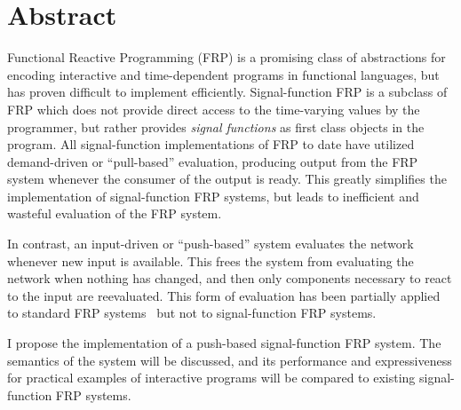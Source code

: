 \section*{Abstract}
Functional Reactive Programming (FRP) is a promising class of abstractions for encoding interactive and time-dependent programs in
functional languages, but has proven difficult to implement efficiently. Signal-function FRP is a subclass of FRP which does not provide
direct access to the time-varying  values by the programmer, but rather provides {\em signal functions} as first class objects in the
program. All signal-function implementations of FRP to date have utilized demand-driven or ``pull-based''  evaluation, producing output from
the FRP system whenever the consumer of the output is ready. This greatly simplifies the implementation of signal-function FRP systems, but
leads to inefficient and wasteful evaluation of the FRP system.

In contrast, an input-driven or ``push-based'' system evaluates the network whenever new input is available. This frees the system from
evaluating the network when nothing has changed, and then only components necessary to react to the input are reevaluated.
This form of evaluation has been partially applied to standard FRP systems~\cite{Elliott2009} but not to signal-function FRP systems.

I propose the implementation of a push-based signal-function FRP system. The semantics of the system will be discussed, and its performance
and expressiveness for practical examples of interactive programs will be compared to existing signal-function FRP systems. 
